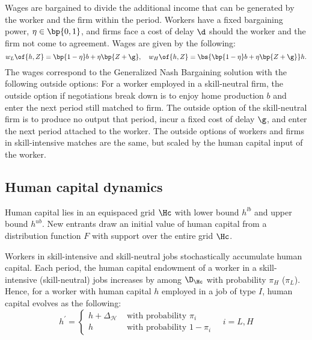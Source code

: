 \documentclass[12pt]{article}
\theoremstyle{definition}
\begin{document}
Wages are bargained to divide the additional income that can be generated by the worker and the firm within the period. Workers have a fixed bargaining power, $\eta \in \bp{0,1}$, and firms face a cost of delay $\d$ should the worker and the firm not come to agreement. Wages are given by the following:
\begin{equation}
    \label{4}
    w_L\of{h, Z} = \bp{1-\eta} b + \eta\bp{Z + \g}, \quad w_H\of{h, Z} = \bs{\bp{1-\eta}b + \eta\bp{Z+\g}}h.
\end{equation}
The wages correspond to the Generalized Nash Bargaining solution with the following outside options: For a worker employed in a skill-neutral firm, the outside option if negotiations break down is to enjoy home production $b$ and enter the next period still matched to firm. The outside option of the skill-neutral firm is to produce no output that period, incur a fixed cost of delay $\g$, and enter the next period attached to the worker. The outside options of workers and firms in skill-intensive matches are the same, but scaled by the human capital input of the worker.

\subsection{Human capital dynamics}

Human capital lies in an equispaced grid $\Hc$ with lower bound $h^{lb}$ and upper bound $h^{ub}$. New entrants draw an initial value of human capital from a distribution function $F$ with support over the entire grid $\Hc$. 

Workers in skill-intensive and skill-neutral jobs stochastically accumulate human capital. Each period, the human capital endowment of a worker in a skill-intensive (skill-neutral) jobs increases by among $\D_\Hc$ with probability $\pi_H$ ($\pi_L$). Hence, for a worker with human capital $h$ employed in a job of type $I$, human capital evolves as the following:
\begin{equation}
    \label{5}
    h^{\prime}=\left\{\begin{array}{ll}
        h+\Delta_{\mathcal{H}} & \text { with probability } \pi_i \\
        h & \text { with probability } 1-\pi_i
        \end{array} \quad i=L, H\right.
\end{equation}
\end{document}
